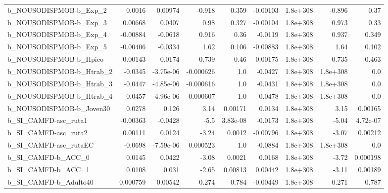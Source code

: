 \begin{tabular}{lrrrrrrrr}
b\_NOUSODISPMOB-b\_Exp\_2       &      0.0016 &      0.00974 &    -0.918 &    0.359 &   -0.00103 &    1.8e+308 &       -0.896 &          0.37 \\
b\_NOUSODISPMOB-b\_Exp\_3       &     0.00668 &       0.0407 &      0.98 &    0.327 &   -0.00104 &    1.8e+308 &        0.973 &          0.33 \\
b\_NOUSODISPMOB-b\_Exp\_4       &    -0.00884 &      -0.0618 &     0.916 &     0.36 &    -0.0119 &    1.8e+308 &        0.937 &         0.349 \\
b\_NOUSODISPMOB-b\_Exp\_5       &    -0.00406 &      -0.0334 &      1.62 &    0.106 &   -0.00883 &    1.8e+308 &         1.64 &         0.102 \\
b\_NOUSODISPMOB-b\_Hpico       &     0.00143 &       0.0174 &     0.739 &     0.46 &   -0.00175 &    1.8e+308 &        0.735 &         0.463 \\
b\_NOUSODISPMOB-b\_Htrab\_2     &     -0.0345 &    -3.75e-06 & -0.000626 &      1.0 &    -0.0427 &    1.8e+308 &     1.8e+308 &           0.0 \\
b\_NOUSODISPMOB-b\_Htrab\_3     &     -0.0447 &    -4.85e-06 & -0.000616 &      1.0 &    -0.0431 &    1.8e+308 &     1.8e+308 &           0.0 \\
b\_NOUSODISPMOB-b\_Htrab\_4     &     -0.0457 &    -4.96e-06 & -0.000607 &      1.0 &    -0.0478 &    1.8e+308 &     1.8e+308 &           0.0 \\
b\_NOUSODISPMOB-b\_Joven30     &      0.0278 &        0.126 &      3.14 &  0.00171 &     0.0134 &    1.8e+308 &         3.15 &       0.00165 \\
b\_SI\_CAMFD-asc\_ruta1         &    -0.00363 &      -0.0428 &      -5.5 & 3.83e-08 &    -0.0173 &    1.8e+308 &        -5.04 &      4.72e-07 \\
b\_SI\_CAMFD-asc\_ruta2         &     0.00111 &       0.0124 &     -3.24 &   0.0012 &   -0.00796 &    1.8e+308 &        -3.07 &       0.00212 \\
b\_SI\_CAMFD-asc\_rutaEC        &     -0.0698 &    -7.59e-06 &  0.000523 &      1.0 &    -0.0884 &    1.8e+308 &     1.8e+308 &           0.0 \\
b\_SI\_CAMFD-b\_ACC\_0           &      0.0145 &       0.0422 &     -3.08 &   0.0021 &     0.0168 &    1.8e+308 &        -3.72 &      0.000198 \\
b\_SI\_CAMFD-b\_ACC\_1           &      0.0108 &        0.031 &     -2.65 &  0.00813 &    0.00442 &    1.8e+308 &        -3.11 &       0.00189 \\
b\_SI\_CAMFD-b\_Adulto40        &    0.000759 &      0.00542 &     0.274 &    0.784 &   -0.00449 &    1.8e+308 &        0.271 &         0.787 \\

\end{tabular}
